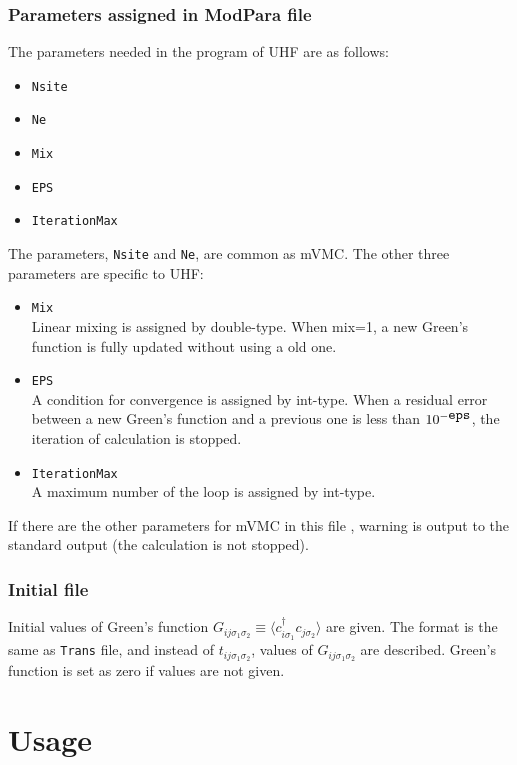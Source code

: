 \subsubsection{Parameters assigned in ModPara file}

The parameters needed in the program of UHF are as follows:
\begin{itemize}
\item{\verb|Nsite|}
\item{\verb|Ne|}
\item{\verb|Mix|}
\item{\verb|EPS|}
\item{\verb|IterationMax|}
\end{itemize}
The parameters, \verb|Nsite| and \verb|Ne|, are common as mVMC.
The other three parameters are specific to UHF:
\begin{itemize}
\item{\verb|Mix|}\\
Linear mixing is assigned by double-type.
When mix=1, a new Green's function is fully updated without using a old one.
\item{\verb|EPS|}\\
A condition for convergence is assigned by int-type.
When a residual error between a new Green's function and a previous one is less than $10^{-\verb|eps|}$, the iteration of calculation is stopped.
\item{\verb|IterationMax|}\\
A maximum number of the loop is assigned by int-type.
\end{itemize}
If there are the other parameters for mVMC in this file , warning is output to the standard output (the calculation is not stopped).

\subsubsection{Initial file}
Initial values of Green's function $G_{ij\sigma_1\sigma_2}\equiv \langle c_{i\sigma_1}^\dag c_{j\sigma_2}\rangle$ are given.
The format is the same as \verb|Trans| file, and instead of $t_{ij\sigma_1\sigma_2}$, values of $G_{ij\sigma_1\sigma_2}$ are described.
Green's function is set as zero if values are not given.

\section{Usage}

